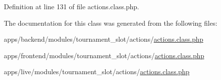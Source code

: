 Definition at line 131 of file actions.\-class.\-php.



The documentation for this class was generated from the following files\-:\begin{DoxyCompactItemize}
\item 
apps/backend/modules/tournament\-\_\-slot/actions/\hyperlink{backend_2modules_2tournament__slot_2actions_2actions_8class_8php}{actions.\-class.\-php}\item 
apps/frontend/modules/tournament\-\_\-slot/actions/\hyperlink{frontend_2modules_2tournament__slot_2actions_2actions_8class_8php}{actions.\-class.\-php}\item 
apps/live/modules/tournament\-\_\-slot/actions/\hyperlink{live_2modules_2tournament__slot_2actions_2actions_8class_8php}{actions.\-class.\-php}\end{DoxyCompactItemize}
